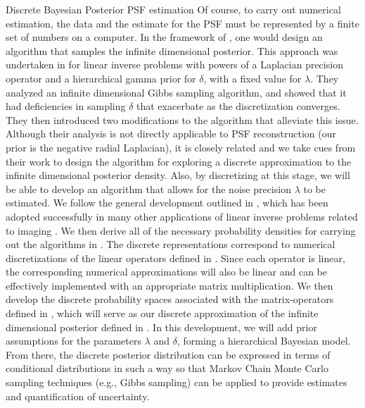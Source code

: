 \begin{chapter}{Discrete Bayesian Posterior PSF estimation}
Of course, to carry out numerical estimation, the data and the estimate for the PSF must be represented by a finite set of numbers on a computer.
In the framework of \citep{stuart2010}, one would design an algorithm that samples the infinite dimensional posterior. 
This approach was undertaken in \citep{agapiou2014analysis} for linear inverse problems with powers of a Laplacian precision operator and a hierarchical gamma prior for $\delta$, with a fixed value for $\lambda$. 
They analyzed an infinite dimensional Gibbs sampling algorithm, and showed that it had deficiencies in sampling $\delta$ that exacerbate as the discretization converges.
They then introduced two modifications to the algorithm that alleviate this issue.
Although their analysis is not directly applicable to PSF reconstruction (our prior is the negative radial Laplacian), it is closely related and we take cues from their work to design the algorithm for exploring a discrete approximation to the infinite dimensional posterior density.
Also, by discretizing at this stage, we will be able to develop an algorithm that allows for the noise precision $\lambda$ to be estimated.
We follow the general development outlined in \citep{bardsley2012mcmc}, which has been adopted successfully in many other applications of linear inverse problems related to imaging \citep{howard2016bayesian,bardsley2016metropolis,fowler2016stochastic,bardsley2015dealing,bardsley2013efficient}.
We then derive all of the necessary probability densities for carrying out the algorithms in .
The discrete representations correspond to numerical discretizations of the linear operators defined in .
Since each operator is linear, the corresponding numerical approximations will also be linear and can be effectively implemented with an appropriate matrix multiplication.
We then develop the discrete probability spaces associated with the matrix-operators defined in , which will serve as our discrete approximation of the infinite dimensional posterior defined in .
In this development, we will add prior assumptions for the parameters $\lambda$ and $\delta$, forming a hierarchical Bayesian model.
From there, the discrete posterior distribution can be expressed in terms of conditional distributions in such a way so that Markov Chain Monte Carlo sampling techniques (e.g., Gibbs sampling) can be applied to provide estimates and quantification of uncertainty.


\end{chapter}
